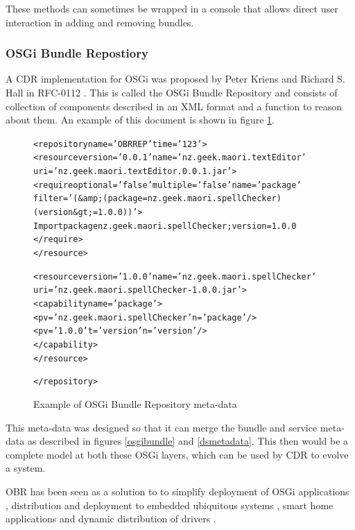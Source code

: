 These methods can sometimes be wrapped in a console that allows direct user interaction in adding and removing bundles.

\subsubsection{OSGi Bundle Repostiory}
A CDR implementation for OSGi was proposed by Peter Kriens and Richard S. Hall in RFC-0112 \citep{the_osgi_alliance_rfc-0112_2006}.
This is called the OSGi Bundle Repository and consists of collection of components described in an XML format and a function to reason about them.
An example of this document is shown in figure \ref{obrmetadata}.

\begin{figure}[htp]
\begin{center}
\begin{alltt}
<repository name='OBR REP' time='123'> 
  <resource version='0.0.1' name='nz.geek.maori.textEditor' 
  uri='nz.geek.maori.textEditor.0.0.1.jar'> 
    <require optional='false'  multiple='false'  name='package' 
        filter='(&amp;(package=nz.geek.maori.spellChecker)(version&gt;=1.0.0))'> 
      Import package nz.geek.maori.spellChecker ;version=1.0.0 
    </require> 
  </resource> 

  <resource version='1.0.0' name='nz.geek.maori.spellChecker' 
  uri='nz.geek.maori.spellChecker-1.0.0.jar'> 
    <capability name='package'> 
      <p v='nz.geek.maori.spellChecker' n='package'/> 
      <p v='1.0.0' t='version' n='version'/> 
    </capability> 
  </resource> 

</repository>
\end{alltt}
  \caption[OSGi Bundle Repository markup example]{Example of OSGi Bundle Repository meta-data}
  \label{obrmetadata}
\end{center}
\end{figure}

This meta-data was designed so that it can merge the bundle and service meta-data as described in figures \ref{osgibundle} and \ref{dsmetadata}.
This then would be a complete model at both these OSGi layers, which can be used by CDR to evolve a system. 

OBR has been seen as a solution to to simplify deployment of OSGi applications \cite{Jung2007}, 
distribution and deployment to embedded ubiquitous systems \cite{Jung2006}, 
smart home applications \cite{Gouin-Vallerand2007} and 
dynamic distribution of drivers \cite{Kriens2008}. 

